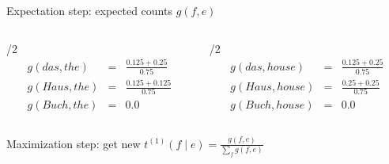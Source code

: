 \begin{frame}
\begin{block}{Expectation step: expected counts $g(f,e)$}
\begin{columns}
\begin{column}{\textwidth/2}
\[
\begin{array}{lcl}
g(das, the) & = & \frac{0.125 + 0.25}{0.75} \\
g(Haus, the) & = & \frac{0.125 + 0.125}{0.75} \\
g(Buch, the) & = & 0.0  
\end{array}
\]

\end{column}

\begin{column}{\textwidth/2}
\[
\begin{array}{lcl}
g(das, house) & = & \frac{0.125 + 0.25}{0.75} \\
g(Haus, house) & = & \frac{0.25 + 0.25}{0.75} \\
g(Buch, house) & = & 0.0 
 \end{array}
\]

\end{column}

\end{columns}

\end{block}\pause

\begin{block}{Maximization step: get new $t^{(1)}(f \mid e) = \frac{ g(f,e) }{ \sum_f g(f,e) } $}

\end{block}

\end{frame}

